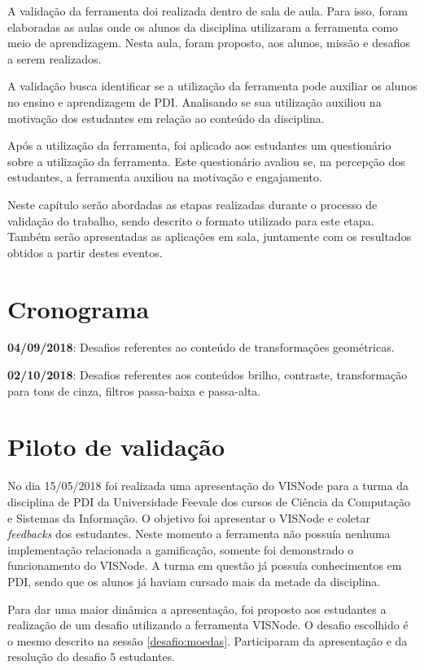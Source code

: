 \documentclass[
	12pt,				%
	oneside,			%
	a4paper,			%
	english,			%
	french,				%
	spanish,			%
	brazil,				%
	]{abntex2}
\begin{document}
A validação da ferramenta doi realizada dentro de sala de aula. Para isso, foram elaboradas as aulas onde os alunos da disciplina utilizaram a ferramenta como meio de aprendizagem. Nesta aula, foram proposto, aos alunos, missão e desafios a serem realizados.

A validação busca identificar se a utilização da ferramenta pode auxiliar os alunos no ensino e aprendizagem de PDI. Analisando se sua utilização auxiliou na motivação dos estudantes em relação ao conteúdo da disciplina.

Após a utilização da ferramenta, foi aplicado aos estudantes um questionário sobre a utilização da ferramenta. Este questionário avaliou se, na percepção dos estudantes, a ferramenta auxiliou na motivação e engajamento.

Neste capítulo serão abordadas as etapas realizadas durante o processo de validação do trabalho, sendo descrito o formato utilizado para este etapa. Também serão apresentadas as aplicações em sala, juntamente com os resultados obtidos a partir destes eventos.

\section{Cronograma}

\textbf{04/09/2018}: Desafios referentes ao conteúdo de transformações geométricas.

\textbf{02/10/2018}: Desafios referentes aos conteúdos brilho, contraste, transformação para tons de cinza, filtros passa-baixa e passa-alta.


\section{Piloto de validação}
\label{validacao:piloto1}

No dia 15/05/2018 foi realizada uma apresentação do VISNode para a turma da disciplina de PDI da Universidade Feevale dos cursos de Ciência da Computação e Sistemas da Informação. O objetivo  foi apresentar o VISNode e coletar \textit{feedbacks} dos estudantes. Neste momento a ferramenta não possuía nenhuma implementação relacionada a gamificação, somente foi demonstrado o funcionamento do VISNode. A turma em questão já possuía conhecimentos em PDI, sendo que os alunos já haviam cursado mais da metade da disciplina.

Para dar uma maior dinâmica a apresentação, foi proposto aos estudantes a realização de um desafio utilizando a ferramenta VISNode. O desafio escolhido é o mesmo descrito na sessão \ref{desafio:moedas}. Participaram da apresentação e da resolução do desafio 5 estudantes.
\end{document}
